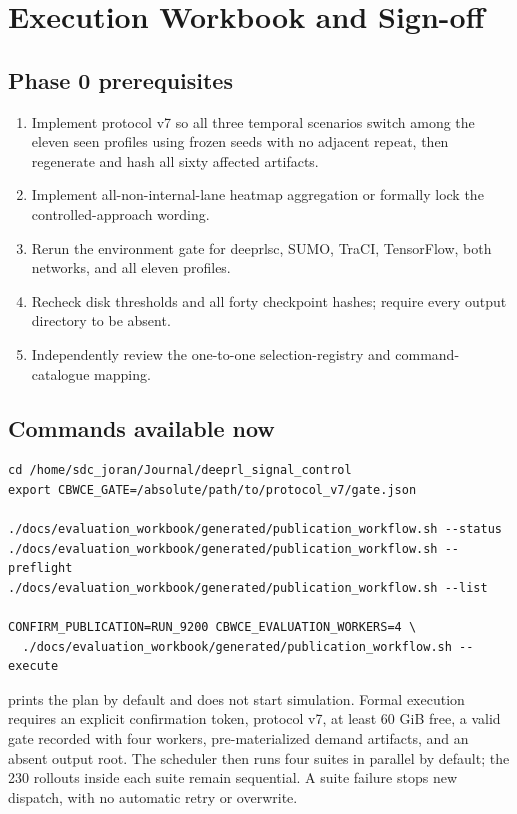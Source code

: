 \chapter{Execution Workbook and Sign-off}

\section{Phase 0 prerequisites}
\begin{enumerate}
  \item Implement protocol v7 so all three temporal scenarios switch among the eleven seen profiles using frozen seeds with no adjacent repeat, then regenerate and hash all sixty affected artifacts.
  \item Implement all-non-internal-lane heatmap aggregation or formally lock the controlled-approach wording.
  \item Rerun the environment gate for deeprlsc, SUMO, TraCI, TensorFlow, both networks, and all eleven profiles.
  \item Recheck disk thresholds and all forty checkpoint hashes; require every output directory to be absent.
  \item Independently review the one-to-one selection-registry and command-catalogue mapping.
\end{enumerate}

\section{Commands available now}
\begin{Verbatim}[fontsize=\small,breaklines=true]
cd /home/sdc_joran/Journal/deeprl_signal_control
export CBWCE_GATE=/absolute/path/to/protocol_v7/gate.json

./docs/evaluation_workbook/generated/publication_workflow.sh --status
./docs/evaluation_workbook/generated/publication_workflow.sh --preflight
./docs/evaluation_workbook/generated/publication_workflow.sh --list

CONFIRM_PUBLICATION=RUN_9200 CBWCE_EVALUATION_WORKERS=4 \
  ./docs/evaluation_workbook/generated/publication_workflow.sh --execute
\end{Verbatim}
 prints the plan by default and does not start simulation. Formal execution requires an explicit confirmation token, protocol v7, at least 60 GiB free, a valid gate recorded with four workers, pre-materialized demand artifacts, and an absent output root. The scheduler then runs four suites in parallel by default; the 230 rollouts inside each suite remain sequential. A suite failure stops new dispatch, with no automatic retry or overwrite.

